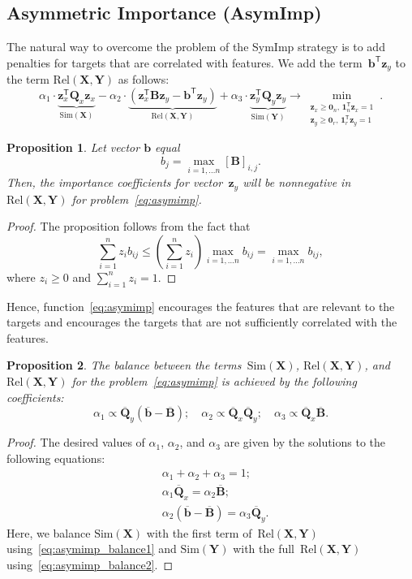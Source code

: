 \documentclass[12pt,twoside]{article}
\newtheorem{proposition}{Proposition}
\theoremstyle{definition}
\newcommand{\bz}{\mathbf{z}}
\newcommand{\bb}{\mathbf{b}}
\newcommand{\bY}{\mathbf{Y}}
\newcommand{\bX}{\mathbf{X}}
\newcommand{\bB}{\mathbf{B}}
\newcommand{\bQ}{\mathbf{Q}}
\newcommand{\T}{\mathsf{T}}
\newcommand{\bOne}{\boldsymbol{1}}
\newcommand{\bZero}{\boldsymbol{0}}
\begin{document}
\subsection{Asymmetric Importance (AsymImp)}
The natural way to overcome the problem of the SymImp strategy is to add penalties for targets that are correlated with features.
We add the term~$\bb^{\T} \bz_y$ to the term $\text{Rel}(\bX, \bY)$ as follows:
\begin{equation}
\alpha_1 \cdot \underbrace{\bz_x^{\T} \bQ_x \bz_x}_{\text{Sim}(\bX)} - \alpha_2 \cdot  \underbrace{\left(\bz_x^{\T} \bB \bz_y - \bb^{\T} \bz_y \right) }_{\text{Rel}(\bX, \bY)} + \alpha_3 \cdot \underbrace{\bz_y^{\T} \bQ_y \bz_y}_{\text{Sim}(\bY)} \rightarrow \min_{\substack{\bz_x \geq \bZero_n, \, \bOne_n^{\T}\bz_x=1 \\ \bz_y \geq \bZero_r, \, \bOne_r^{\T}\bz_y=1}}.
\label{eq:asymimp}
\end{equation}
\begin{proposition}
	Let vector $\bb$ equal
	\begin{equation*}
	b_j = \max_{i=1, \dots n} [\bB]_{i, j}.
	\end{equation*}
	Then, the importance coefficients for vector~$\bz_y$ will be nonnegative in~$\text{Rel}(\bX, \bY)$ for problem~\eqref{eq:asymimp}.
\end{proposition}
\begin{proof}
	The proposition follows from the fact that
	\[
	\sum_{i=1}^n  z_i b_{ij} \leq \left(\sum_{i=1}^n z_i \right)\max_{i=1, \dots n} b_{ij} = \max_{i=1, \dots n} b_{ij},
	\]
	where $z_i \geq 0$ and $\sum_{i=1}^nz_i = 1$.
\end{proof}
Hence, function~\eqref{eq:asymimp} encourages the features that are relevant to the targets and encourages the targets that are not sufficiently correlated with the features. 
\begin{proposition}
	The balance between the terms~$\text{Sim}(\bX)$, $\text{Rel}(\bX, \bY)$, and $\text{Rel}(\bX, \bY)$ for the problem~\eqref{eq:asymimp} is achieved by the following coefficients:
	\begin{equation*}
	\alpha_1 \propto \overline{\bQ}_y \left( \overline{\bb} - \overline{\bB}\right); \quad
	\alpha_2 \propto \overline{\bQ}_x \overline{\bQ}_y; \quad
	\alpha_3  \propto \overline{\bQ}_x \overline{\bB}.
	\end{equation*}
\end{proposition}
\begin{proof}
	The desired values of $\alpha_1$, $\alpha_2$, and $\alpha_3$ are given by the solutions to the following equations:
	\begin{align}
	&\alpha_1 + \alpha_2 + \alpha_3 = 1; \\
	&\alpha_1 \overline{\bQ}_x = \alpha_2 \overline{\bB}; \label{eq:asymimp_balance1}\\
	&\alpha_2 \left(\overline{\bb} - \overline{\bB} \right) = \alpha_3 \overline{\bQ}_y.
	\label{eq:asymimp_balance2}
	\end{align}
	Here, we balance $\text{Sim}(\bX)$ with the first term of~$\text{Rel}(\bX, \bY)$ using~\eqref{eq:asymimp_balance1} and $\text{Sim}(\bY)$ with the full~$\text{Rel}(\bX, \bY)$ using~\eqref{eq:asymimp_balance2}.
\end{proof}
\end{document}
